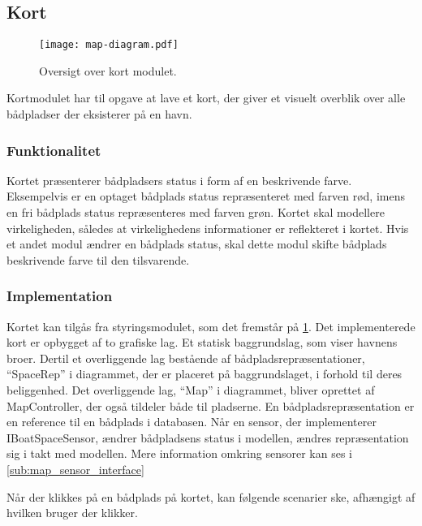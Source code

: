 \subsection{Kort}
\label{sub:kort}

\begin{figure}
  \centering
  \texttt{[image: map-diagram.pdf]}
  \caption{Oversigt over kort modulet.}
  \label{fig:map_diagram}
\end{figure}

Kortmodulet har til opgave at lave et kort, der giver et visuelt overblik over alle bådpladser der eksisterer på en havn.

\subsubsection{Funktionalitet}
\label{ssub:kort_funktionalitet}

Kortet præsenterer bådpladsers status i form af en beskrivende farve. Eksempelvis er en optaget bådplads status repræsenteret med farven rød, imens en fri bådplads status repræsenteres med farven grøn. Kortet skal modellere virkeligheden, således at virkelighedens informationer er reflekteret i kortet. Hvis et andet modul ændrer en bådplads status, skal dette modul skifte bådplads beskrivende farve til den tilsvarende.

\subsubsection{Implementation}
\label{ssub:kort_implementation}

Kortet kan tilgås fra styringsmodulet, som det fremstår på \cref{fig:map_diagram}. Det implementerede kort er opbygget af to grafiske lag. Et statisk baggrundslag, som viser havnens broer. Dertil et overliggende lag bestående af bådpladsrepræsentationer, \enquote{SpaceRep} i diagrammet, der er placeret på baggrundslaget, i forhold til deres beliggenhed. Det overliggende lag, \enquote{Map} i diagrammet, bliver oprettet af MapController, der også tildeler både til pladserne. En bådpladsrepræsentation er en reference til en bådplads i databasen. Når en sensor, der implementerer IBoatSpaceSensor, ændrer bådpladsens status i modellen, ændres repræsentation sig i takt med modellen. Mere information omkring sensorer kan ses i \cref{sub:map_sensor_interface}

Når der klikkes på en bådplads på kortet, kan følgende scenarier ske, afhængigt af hvilken bruger der klikker.

